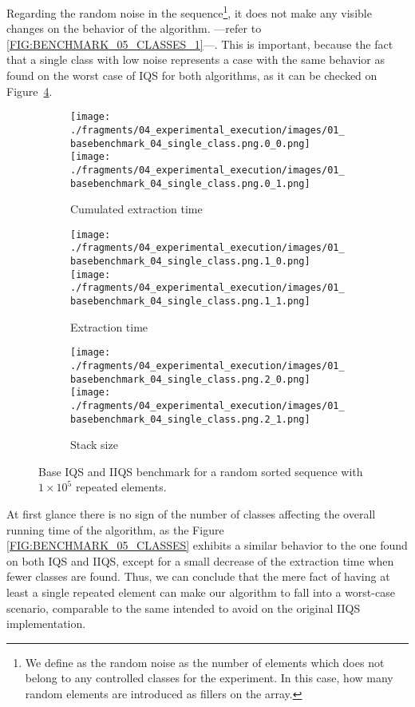 Regarding the random noise in the sequence\footnote{We define as the random noise as the number of elements which does not belong to any controlled classes for the experiment. In this case, how many random elements are introduced as fillers on the array.}, it does not make any visible changes on the behavior of the algorithm. ---refer to \ref{FIG:BENCHMARK_05_CLASSES_1}---. This is important, because the fact that a single class with low noise represents a case with the same behavior as found on the worst case of IQS for both algorithms, as it can be checked on Figure~\ref{FIG:BENCHMARK_04_SINGLE_CLASS}.\\


\begin{figure}
    \centering
    \begin{subfigure}[b]{\textwidth}
        \centering
        \texttt{[image: ./fragments/04\_experimental\_execution/images/01\_basebenchmark\_04\_single\_class.png.0\_0.png]}
        \texttt{[image: ./fragments/04\_experimental\_execution/images/01\_basebenchmark\_04\_single\_class.png.0\_1.png]}
        \caption{Cumulated extraction time}
        \label{FIG:BENCHMARK_04_SINGLE_CLASS__0_0}
    \end{subfigure}

    \begin{subfigure}[b]{\textwidth}
        \centering
        \texttt{[image: ./fragments/04\_experimental\_execution/images/01\_basebenchmark\_04\_single\_class.png.1\_0.png]}
        \texttt{[image: ./fragments/04\_experimental\_execution/images/01\_basebenchmark\_04\_single\_class.png.1\_1.png]}
        \caption{Extraction time}
        \label{FIG:BENCHMARK_04_SINGLE_CLASS__0_1}
    \end{subfigure}

    \begin{subfigure}[b]{\textwidth}
        \centering
        \texttt{[image: ./fragments/04\_experimental\_execution/images/01\_basebenchmark\_04\_single\_class.png.2\_0.png]}
        \texttt{[image: ./fragments/04\_experimental\_execution/images/01\_basebenchmark\_04\_single\_class.png.2\_1.png]}
        \caption{Stack size}
        \label{FIG:BENCHMARK_04_SINGLE_CLASS__0_2}
    \end{subfigure}
    
    \caption{Base IQS and IIQS benchmark for a random sorted sequence with $1\times10^5$ repeated elements.}
    \label{FIG:BENCHMARK_04_SINGLE_CLASS}
\end{figure}

At first glance there is no sign of the number of classes affecting the overall running time of the algorithm, as the Figure \ref{FIG:BENCHMARK_05_CLASSES} exhibits a similar behavior to the one found on both IQS and IIQS, except for a small decrease of the extraction time when fewer classes are found. Thus, we can conclude that the mere fact of having at least a single repeated element can make our algorithm to fall into a worst-case scenario, comparable to the same intended to avoid on the original IIQS implementation.\\

\FloatBarrier